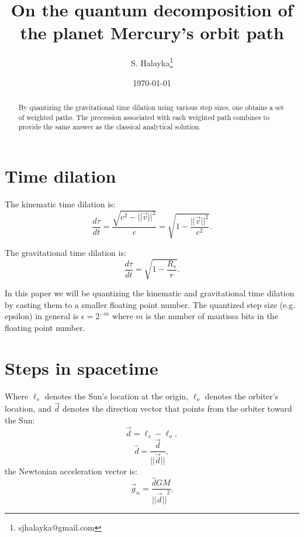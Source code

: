 \documentclass[12pt]{article}
\title{On the quantum decomposition of the planet Mercury's orbit path}
\author{S. Halayka\footnote{sjhalayka@gmail.com}}
\date{\today\;\currenttime}
\begin{document}
 
\maketitle

\begin{abstract}
By quantizing the gravitational time dilation using various step sizes, one obtains a set of weighted paths.
The precession associated with each weighted path combines to provide the same answer as the classical analytical solution.
\end{abstract}


\section{Time dilation}

The kinematic time dilation is:
\begin{equation}
\label{eq_intro_kinematic}
\frac{d\tau}{dt} = \frac{\sqrt{c^2 - \lvert\lvert \vec{v}\rvert\rvert^2}}{c} = \sqrt{1 - \frac{\lvert\lvert \vec{v}\rvert\rvert^2}{c^2}}.
\end{equation}

The gravitational time dilation is:
\begin{equation}
\label{eq_intro_gravitational}
\frac{d\tau}{dt} = \sqrt{1 - \frac{R_s}{r}}.
\end{equation}

In this paper we will be quantizing the kinematic and gravitational time dilation by casting them to a smaller floating point number. The quantized step size (e.g. epsilon) in general is $\epsilon = 2^{-m}$ where $m$ is the number of mantissa bits in the floating point number.






\section{Steps in spacetime}

Where $\ell_s$ denotes the Sun's location at the origin, $\ell_o$ denotes the orbiter's location, and $\vec{d}$ denotes the direction vector that points from the orbiter toward the Sun:
\begin{equation}
\label{direction_vector}
\vec{d} = \ell_{s} - \ell_{o},	
\end{equation}
\begin{equation}
\label{direction_unit_vector}
\hat{d} = \frac{\vec{d}}{\lvert\lvert \vec{d} \rvert\rvert},
\end{equation}
the Newtonian acceleration vector is:
\begin{equation}
\label{newton}
\vec{g}_n = \frac{\hat{d} G M}{{\lvert\lvert \vec{d} \rvert\rvert}^2}.
\end{equation}
\end{document}
